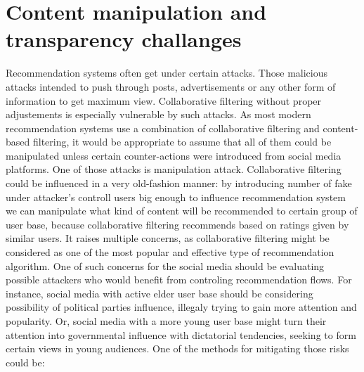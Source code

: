 \documentclass[10pt,twocolumn,twoside,a4paper]{report} %
\begin{document}
\section{Content manipulation and transparency challanges} \label{content_manipulation}
Recommendation systems often get under certain attacks. Those malicious attacks intended to push through posts, advertisements or any other form of information
to get maximum view. \cite{propagandasafety}
Collaborative filtering without proper adjustements is especially vulnerable by such attacks. \cite{ManipulationAttacks} As most modern recommendation systems use a combination of collaborative filtering and content-based filtering, it would be appropriate to assume that all of them could be manipulated unless certain counter-actions were introduced from social media platforms.
One of those attacks is manipulation attack. \cite{ManipulationAttacks} Collaborative filtering could be influenced in a very old-fashion manner: by introducing number of fake under attacker's controll users big enough to influence recommendation system we can manipulate what kind of content will be recommended to certain group of user base, because collaborative filtering recommends based on ratings given by similar users.
It raises multiple concerns, as collaborative filtering might be considered as one of the most popular and effective type of recommendation algorithm. One of such concerns for the social media should be evaluating possible attackers who would benefit from controling recommendation flows. For instance, social media with active elder user base should be considering possibility of political parties influence, illegaly trying to gain more attention and popularity. Or, social media with a more young user base might turn their attention into governmental influence with dictatorial tendencies, seeking to form certain views in young audiences.
One of the methods for mitigating those risks could be:
\end{document}
